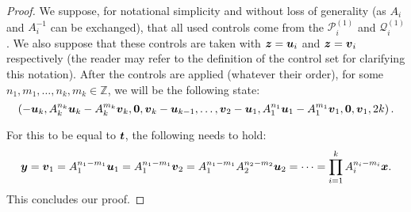 \begin{proof}
We suppose, for notational simplicity and without loss of generality (as $A_{i}$ and $A_{i}^{-1}$ can be exchanged),
that all used controls come from the $\mathcal{P}_{i}^{(1)}$ and $\mathcal{Q}_{i}^{(1)}$.
We also suppose that these controls are taken with $\boldsymbol{z}=\boldsymbol{u}_{i}$ and $\boldsymbol{z}=\boldsymbol{v}_{i}$ respectively
(the reader may refer to the definition of the control set for clarifying this notation).
After the controls are applied (whatever their order), for some $n_{1}, m_{1}, \ldots, n_{k}, m_{k} \in \mathbb{Z}$, we will be the following state:
\begin{equation*}
  \left(
  -\boldsymbol{u}_{k}, A_{k}^{n_{k}} \boldsymbol{u}_{k} - A_{k}^{m_{k}} \boldsymbol{v}_{k}, \boldsymbol{0}, \boldsymbol{v}_{k} - \boldsymbol{u}_{k-1},
  \ldots,
  \boldsymbol{v}_{2} - \boldsymbol{u}_{1}, A_{1}^{n_{1}} \boldsymbol{u}_{1} - A_{1}^{m_{1}} \boldsymbol{v}_{1}, \boldsymbol{0}, \boldsymbol{v}_{1},
  2k
  \right).
\end{equation*}

For this to be equal to $\boldsymbol{t}$, the following needs to hold:
\begin{equation*}
  \boldsymbol{y} = \boldsymbol{v}_{1} = A_{1}^{n_{1} - m_{1}} \boldsymbol{u}_{1} = A_{1}^{n_{1} - m_{1}} \boldsymbol{v}_{2} =
  A_{1}^{n_{1} - m_{1}} A_{2}^{n_{2} - m_{2}} \boldsymbol{u}_{2} = \cdots = \prod\limits_{i=1}^{k} A_{i}^{n_{i} - m_{i}} \boldsymbol{x}.
\end{equation*}
This concludes our proof.
\end{proof}
